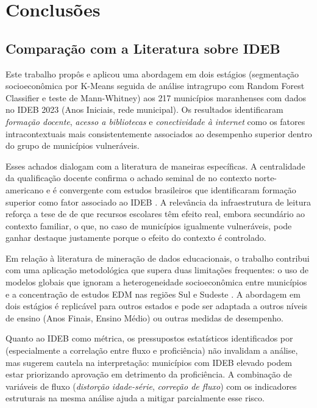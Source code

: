 \chapter{Conclusões}
\label{cap:conclusions}

\section{Comparação com a Literatura sobre IDEB}

Este trabalho propôs e aplicou uma abordagem em dois estágios (segmentação socioeconômica por K-Means seguida de análise intragrupo com Random Forest Classifier e teste de Mann-Whitney) aos 217 municípios maranhenses com dados no IDEB 2023 (Anos Iniciais, rede municipal). Os resultados identificaram \textit{formação docente}, \textit{acesso a bibliotecas} e \textit{conectividade à internet} como os fatores intracontextuais mais consistentemente associados ao desempenho superior dentro do grupo de municípios vulneráveis.

Esses achados dialogam com a literatura de maneiras específicas. A centralidade da qualificação docente confirma o achado seminal de \citet{rivkin2005} no contexto norte-americano e é convergente com estudos brasileiros que identificaram formação superior como fator associado ao IDEB \cite{vasconcelos2021}. A relevância da infraestrutura de leitura reforça a tese de \citet{coleman1966} de que recursos escolares têm efeito real, embora secundário ao contexto familiar, o que, no caso de municípios igualmente vulneráveis, pode ganhar destaque justamente porque o efeito do contexto é controlado.

Em relação à literatura de mineração de dados educacionais, o trabalho contribui com uma aplicação metodológica que supera duas limitações frequentes: o uso de modelos globais que ignoram a heterogeneidade socioeconômica entre municípios e a concentração de estudos EDM nas regiões Sul e Sudeste \cite{baker2010, romero2020}. A abordagem em dois estágios é replicável para outros estados e pode ser adaptada a outros níveis de ensino (Anos Finais, Ensino Médio) ou outras medidas de desempenho.

Quanto ao IDEB como métrica, os pressupostos estatísticos identificados por \citet{soares2013} (especialmente a correlação entre fluxo e proficiência) não invalidam a análise, mas sugerem cautela na interpretação: municípios com IDEB elevado podem estar priorizando aprovação em detrimento da proficiência. A combinação de variáveis de fluxo (\textit{distorção idade-série}, \textit{correção de fluxo}) com os indicadores estruturais na mesma análise ajuda a mitigar parcialmente esse risco.

